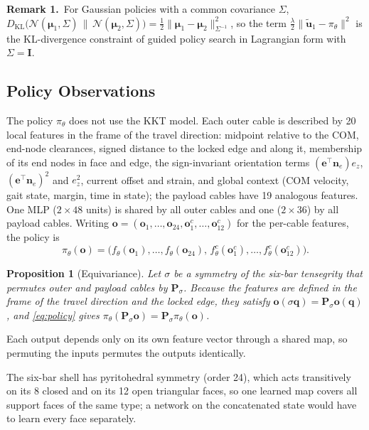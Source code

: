 \documentclass[letterpaper,10pt,conference]{IEEEtran}
\newcommand{\vect}[1]{\boldsymbol{#1}}
\newcommand{\remark}[1]{\noindent\textbf{Remark #1.}\ }
\newtheorem{proposition}{Proposition}
\begin{document}
\remark{1}For Gaussian policies with a common covariance $\Sigma$,
$D_{\mathrm{KL}}\big(\mathcal N(\vect\mu_1,\Sigma)\,\|\,\mathcal N(\vect\mu_2,\Sigma)\big)
=\tfrac12\|\vect\mu_1-\vect\mu_2\|^2_{\Sigma^{-1}}$, so the term
$\tfrac\lambda2\|\tilde{\vect u}_1-\pi_\theta\|^2$ is the
KL-divergence constraint of guided policy search \cite{levine2013guided}
in Lagrangian form with $\Sigma=\vect I$.

\subsection{Policy Observations}
The policy $\pi_\theta$ does not use the KKT model. Each outer cable is
described by 20 local features in the frame of the travel direction:
midpoint relative to the COM, end-node clearances, signed distance to
the locked edge and along it, membership of its end nodes in face and
edge, the sign-invariant orientation terms $(\vect e^\top\vect n_e)e_z$,
$(\vect e^\top\vect n_e)^2$ and $e_z^2$, current offset and strain, and
global context (COM velocity, gait state, margin, time in state); the
payload cables have 19 analogous features. One MLP ($2\times48$ units)
is shared by all outer cables and one ($2\times36$) by all payload
cables. Writing $\vect o=(\vect o_1,\dots,\vect o_{24},\vect o^{c}_1,\dots,\vect o^{c}_{12})$
for the per-cable features, the policy is
\begin{equation}
\pi_\theta(\vect o)=\big(f_\theta(\vect o_1),\dots,f_\theta(\vect o_{24}),\,
f^{c}_\theta(\vect o^{c}_1),\dots,f^{c}_\theta(\vect o^{c}_{12})\big).
\label{eq:policy}
\end{equation}

\begin{proposition}[Equivariance]\label{prop:equiv}
Let $\sigma$ be a symmetry of the six-bar tensegrity that permutes outer
and payload cables by $\vect P_\sigma$. Because the features are defined
in the frame of the travel direction and the locked edge, they satisfy
$\vect o(\sigma\vect q)=\vect P_\sigma\vect o(\vect q)$, and \eqref{eq:policy}
gives $\pi_\theta(\vect P_\sigma\vect o)=\vect P_\sigma\pi_\theta(\vect o)$.
\end{proposition}
\begin{IEEEproof}
Each output depends only on its own feature vector through a shared
map, so permuting the inputs permutes the outputs identically.
\end{IEEEproof}

\noindent The six-bar shell has pyritohedral symmetry (order 24), which
acts transitively on its 8 closed and on its 12 open triangular faces,
so one learned map covers all support faces of the same type; a network
on the concatenated state would have to learn every face separately.
\end{document}
